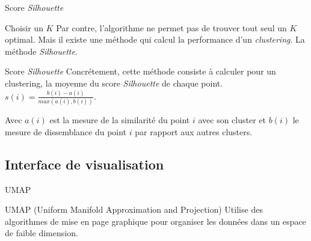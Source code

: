 \documentclass[10pt,handout]{beamer}
\newif\ifplacelogo %
\begin{document}
\begin{frame}{Score \textit{Silhouette}}
    \begin{block}{Choisir un $K$}
        Par contre, l'algorithme ne permet pas de trouver tout seul un $K$ optimal. Mais il existe une méthode qui calcul la performance d'un \textit{clustering}. La méthode \textit{Silhouette}.
    \end{block}
    \begin{block}{Score \textit{Silhouette}}
        Concrétement, cette méthode consiste à calculer pour un clustering, la moyenne du score \textit{Silhouette} de chaque point. $ s(i) = \frac{b(i) - a(i)}{max(a(i), b(i))} $.

        Avec $a(i)$ est la mesure de la similarité du point $i$ avec son cluster et $b(i)$ le mesure de dissemblance du point $i$ par rapport aux autres clusters.
    \end{block}
\end{frame}

\begin{frame}
\end{frame}

\subsection{Interface de visualisation}
\placelogofalse
\begin{frame}{UMAP }
    \begin{block}{UMAP}
        (Uniform Manifold Approximation and Projection) Utilise des algorithmes de mise en page graphique pour organiser les données dans
        un espace de faible dimension.
    \end{block}

\end{frame}
\placelogotrue
\end{document}
